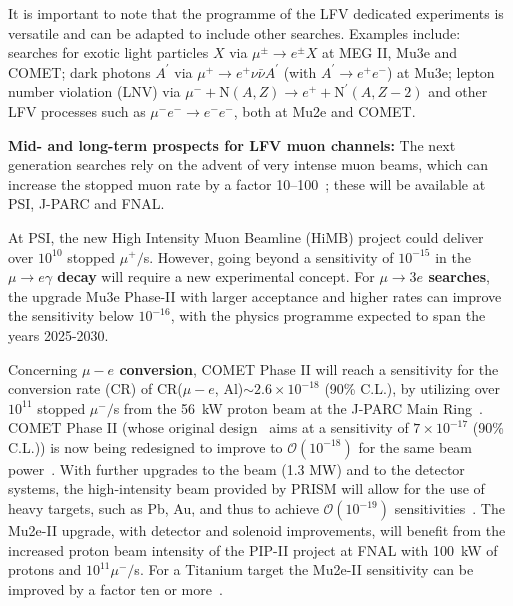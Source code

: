 It is important to note that the programme of the LFV dedicated experiments is versatile and can be adapted to include other searches. Examples include: searches for exotic light particles $X$ via $\mu^{\pm} \to e^{\pm} X$ at MEG II, Mu3e and COMET; dark photons $A^\prime$ via $\mu^+ \to e^+ \nu \bar \nu A^\prime$ (with $A^\prime \to e^+e^-$) at Mu3e; lepton number violation (LNV) via $\mu^- + \text{N}(A,Z) \to e^+ + \text{N}^\prime(A,Z-2)$ and other LFV processes such as $\mu^- e^- \to  e^- e^-$, 
both at Mu2e and COMET. 


{\bf Mid- and long-term prospects for LFV muon channels:} 
The next generation searches rely on the advent 
of very intense muon beams, which can increase
the stopped muon rate by a factor 10--100~\cite{Baldini:2018uhj}; these will be available at PSI, J-PARC and FNAL.



At PSI, the new High Intensity Muon Beamline (HiMB) project could deliver over $10^{10}$ stopped $\mu^+/$s.
However, going beyond a sensitivity of $10^{-15}$ in the \textbf{$\mu \to e \gamma$ decay}
will require a new experimental concept. For \textbf{${\mu \to 3e}$ searches}, the upgrade Mu3e Phase-II with larger acceptance and higher
rates can improve the sensitivity below $10^{-16}$, 
with the physics programme expected to span the years 2025-2030. 

Concerning \textbf{$\mu-e$ conversion}, COMET Phase II will reach a sensitivity for the conversion rate (CR) of 
CR($\mu-e$, Al)$\sim 2.6 \times 10^{-18}$ (90\% C.L.), by utilizing over
$10^{11}$ stopped $\mu^-/$s from the 56~kW proton beam at the J-PARC Main
Ring~\cite{Angelique:2018svf}. 
COMET Phase II (whose original design~\cite{Angelique:2018svf} aims at a sensitivity of $7 \times 10^{-17}$ (90\% C.L.)) is now being redesigned to improve to $\mathcal{O}(10^{-18})$ for the same beam power~\cite{KunoESPP19}. 
With further upgrades to the beam (1.3 MW) and to the detector systems, the 
high-intensity beam provided by PRISM will allow for the use of heavy targets, such as Pb, Au, and thus to achieve $\mathcal{O}(10^{-19})$ sensitivities~\cite{Angelique:2018svf}. 
%
The Mu2e-II upgrade, with detector and solenoid improvements, will benefit from the
increased proton beam intensity of the PIP-II 
project at FNAL with 100~kW of protons and $10^{11} \mu^-/$s. For a  
Titanium target the Mu2e-II sensitivity can be improved by a factor ten
or more~\cite{Knoepfel:2013ouy,Abusalma:2018xem}.

